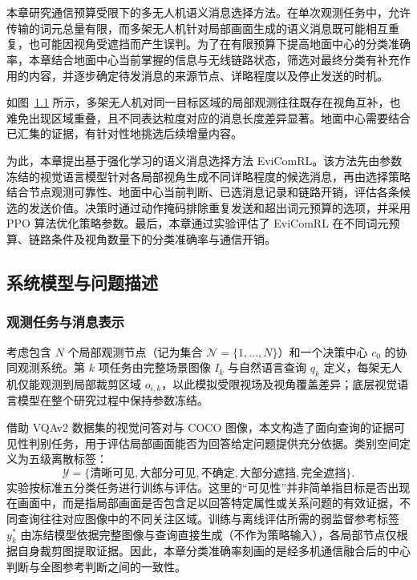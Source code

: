 \chapter{\ResearchTwoTitle}
\label{rq2:chapter}

本章研究通信预算受限下的多无人机语义消息选择方法。在单次观测任务中，允许传输的词元总量有限，而多架无人机针对局部画面生成的语义消息既可能相互重复，也可能因视角受遮挡而产生误判。为了在有限预算下提高地面中心的分类准确率，本章结合地面中心当前掌握的信息与无线链路状态，筛选对最终分类有补充作用的内容，并逐步确定待发消息的来源节点、详略程度以及停止发送的时机。

如图~\ref{rq2:fig:observation} 所示，多架无人机对同一目标区域的局部观测往往既存在视角互补，也难免出现区域重叠，且不同表达粒度对应的消息长度差异显著。地面中心需要结合已汇集的证据，有针对性地挑选后续增量内容。

\begin{figure}[htbp]
\centering

\label{rq2:fig:observation}
\end{figure}

为此，本章提出基于强化学习的语义消息选择方法 EviComRL。该方法先由参数冻结的视觉语言模型针对各局部视角生成不同详略程度的候选消息，再由选择策略结合节点观测可靠性、地面中心当前判断、已选消息记录和链路开销，评估各条候选的发送价值。决策时通过动作掩码排除重复发送和超出词元预算的选项，并采用 PPO 算法优化策略参数。最后，本章通过实验评估了 EviComRL 在不同词元预算、链路条件及视角数量下的分类准确率与通信开销。

\section{系统模型与问题描述}
\label{rq2:sec:model}

\subsection{观测任务与消息表示}

考虑包含 $N$ 个局部观测节点（记为集合 $\mathcal N=\{1,\ldots,N\}$）和一个决策中心 $c_0$ 的协同观测系统。第 $k$ 项任务由完整场景图像 $I_k$ 与自然语言查询 $q_k$ 定义，每架无人机仅能观测到局部裁剪区域 $o_{i,k}$，以此模拟受限视场及视角覆盖差异；底层视觉语言模型在整个研究过程中保持参数冻结。

借助 VQAv2 数据集的视觉问答对与 COCO 图像\cite{vqa-v2,coco}，本文构造了面向查询的证据可见性判别任务，用于评估局部画面能否为回答给定问题提供充分依据。类别空间定义为五级离散标签：
\begin{equation}
\mathcal Y=\{\text{清晰可见},\text{大部分可见},\text{不确定},\text{大部分遮挡},\text{完全遮挡}\}.
\label{rq2:eq:labels}
\end{equation}
实验按标准五分类任务进行训练与评估。这里的“可见性”并非简单指目标是否出现在画面中，而是指局部画面是否包含足以回答特定属性或关系问题的有效证据，不同查询往往对应图像中的不同关注区域\cite{where-to-look-vqa,vqa-hat,gqa}。训练与离线评估所需的弱监督参考标签 $y_k^*$ 由冻结模型依据完整图像与查询直接生成（不作为策略输入），各局部节点仅根据自身裁剪图提取证据。因此，本章分类准确率刻画的是经多机通信融合后的中心判断与全图参考判断之间的一致性。

